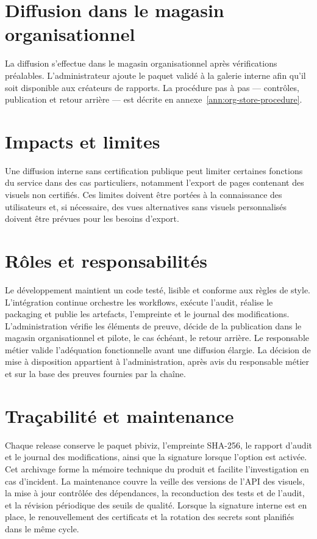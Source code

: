 \section{Diffusion dans le magasin organisationnel}
\label{sec:distribution}

La diffusion s’effectue dans le magasin organisationnel après vérifications préalables. L’administrateur ajoute le paquet validé à la galerie interne afin qu’il soit disponible aux créateurs de rapports. La procédure pas à pas — contrôles, publication et retour arrière — est décrite en annexe~\ref{ann:org-store-procedure}.

\section{Impacts et limites}
\label{sec:limitations}

Une diffusion interne sans certification publique peut limiter certaines fonctions du service dans des cas particuliers, notamment l’export de pages contenant des visuels non certifiés. Ces limites doivent être portées à la connaissance des utilisateurs et, si nécessaire, des vues alternatives sans visuels personnalisés doivent être prévues pour les besoins d’export.

\section{Rôles et responsabilités}
\label{sec:roles-controle}

Le développement maintient un code testé, lisible et conforme aux règles de style. L’intégration continue orchestre les workflows, exécute l’audit, réalise le packaging et publie les artefacts, l’empreinte et le journal des modifications. L’administration vérifie les éléments de preuve, décide de la publication dans le magasin organisationnel et pilote, le cas échéant, le retour arrière. Le responsable métier valide l’adéquation fonctionnelle avant une diffusion élargie. La décision de mise à disposition appartient à l’administration, après avis du responsable métier et sur la base des preuves fournies par la chaîne.

\section{Traçabilité et maintenance}
\label{sec:maintenance-transfert}

Chaque release conserve le paquet pbiviz, l’empreinte SHA-256, le rapport d’audit et le journal des modifications, ainsi que la signature lorsque l’option est activée. Cet archivage forme la mémoire technique du produit et facilite l’investigation en cas d’incident. La maintenance couvre la veille des versions de l’API des visuels, la mise à jour contrôlée des dépendances, la reconduction des tests et de l’audit, et la révision périodique des seuils de qualité. Lorsque la signature interne est en place, le renouvellement des certificats et la rotation des secrets sont planifiés dans le même cycle.
